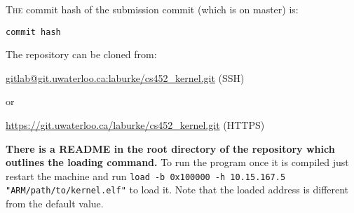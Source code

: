 \documentclass{article}
\begin{document}
\textsc{The} commit hash of the submission commit (which is on master) is:

\texttt{{{{commit hash}}}}

\noindent The repository can be cloned from:

\url{gitlab@git.uwaterloo.ca:laburke/cs452_kernel.git} (SSH)

or

\url{https://git.uwaterloo.ca/laburke/cs452_kernel.git} (HTTPS)

\textbf{There is a README in the root directory of the repository which outlines
the loading command.} To run the program once it is compiled just restart the
machine and run \texttt{load -b 0x100000 -h 10.15.167.5
"ARM/path/to/kernel.elf"} to load it. Note that the loaded address is different
from the default value.
\end{document}
